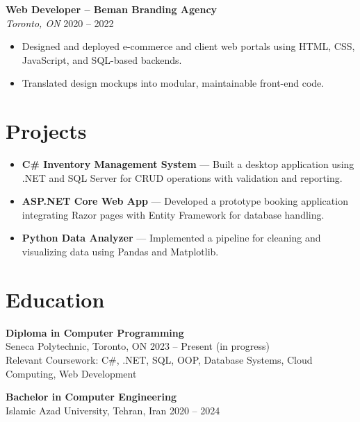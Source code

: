 \documentclass[letterpaper,10pt]{article}
\begin{document}
\textbf{Web Developer – Beman Branding Agency}\\
\textit{Toronto, ON} \hfill 2020 -- 2022
\begin{itemize}[leftmargin=*]
  \item Designed and deployed e-commerce and client web portals using HTML, CSS, JavaScript, and SQL-based backends.
  \item Translated design mockups into modular, maintainable front-end code.
\end{itemize}

\section*{Projects}
\begin{itemize}[leftmargin=*]
  \item \textbf{C\# Inventory Management System} — Built a desktop application using .NET and SQL Server for CRUD operations with validation and reporting.
  \item \textbf{ASP.NET Core Web App} — Developed a prototype booking application integrating Razor pages with Entity Framework for database handling.
  \item \textbf{Python Data Analyzer} — Implemented a pipeline for cleaning and visualizing data using Pandas and Matplotlib.
\end{itemize}

\section*{Education}
\textbf{Diploma in Computer Programming} \\ Seneca Polytechnic, Toronto, ON \hfill 2023 -- Present (in progress) \\
Relevant Coursework: C\#, .NET, SQL, OOP, Database Systems, Cloud Computing, Web Development

\textbf{Bachelor in Computer Engineering} \\ Islamic Azad University, Tehran, Iran \hfill 2020 -- 2024
\end{document}
